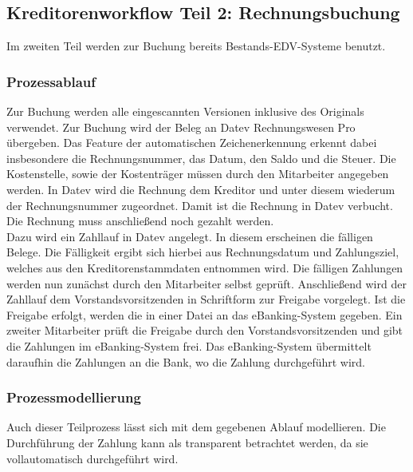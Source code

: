 \subsection{Kreditorenworkflow Teil 2: Rechnungsbuchung}
Im zweiten Teil werden zur Buchung bereits Bestands-EDV-Systeme benutzt.
\subsubsection{Prozessablauf}
Zur Buchung werden alle eingescannten Versionen inklusive des Originals verwendet.
Zur Buchung wird der Beleg an Datev Rechnungswesen Pro übergeben.
Das Feature der automatischen Zeichenerkennung erkennt dabei insbesondere die Rechnungsnummer, das Datum, den Saldo und die Steuer.
Die Kostenstelle, sowie der Kostenträger müssen durch den Mitarbeiter angegeben werden.
In Datev wird die Rechnung dem Kreditor und unter diesem wiederum der Rechnungsnummer zugeordnet.
Damit ist die Rechnung in Datev verbucht.\\
Die Rechnung muss anschließend noch gezahlt werden.\\
Dazu wird ein Zahllauf in Datev angelegt.
In diesem erscheinen die fälligen Belege. 
Die Fälligkeit ergibt sich hierbei aus Rechnungsdatum und Zahlungsziel, welches aus den Kreditorenstammdaten entnommen wird.
Die fälligen Zahlungen werden nun zunächst durch den Mitarbeiter selbst geprüft.
Anschließend wird der Zahllauf dem Vorstandsvorsitzenden in Schriftform zur Freigabe vorgelegt.
Ist die Freigabe erfolgt, werden die in einer Datei an das eBanking-System gegeben.
Ein zweiter Mitarbeiter prüft die Freigabe durch den Vorstandsvorsitzenden und gibt die Zahlungen im eBanking-System frei.
Das eBanking-System übermittelt daraufhin die Zahlungen an die Bank, wo die Zahlung durchgeführt wird.
\subsubsection{Prozessmodellierung}

Auch dieser Teilprozess lässt sich mit dem gegebenen Ablauf modellieren. 
Die Durchführung der Zahlung kann als transparent betrachtet werden, da sie vollautomatisch durchgeführt wird.


